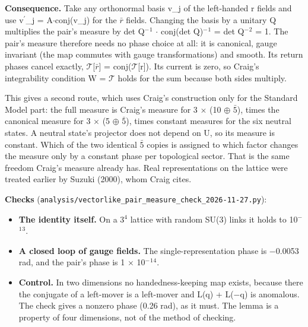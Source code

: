 \documentclass[
  11pt,
]{article}
\providecommand{\tightlist}{%
  \setlength{\itemsep}{0pt}\setlength{\parskip}{0pt}}
\begin{document}
\textbf{Consequence.} Take any orthonormal basis v\_j of the left-handed r fields and use v\ensuremath{^{\prime}}\_j = A\ensuremath{\cdot}conj(v\_j) for the \ensuremath{\bar{r}} fields. Changing the basis by a unitary Q multiplies the pair's measure by det Q\ensuremath{^{-}}\ensuremath{^{1}} \ensuremath{\cdot} conj(det Q)\ensuremath{^{-}}\ensuremath{^{1}} = \textbar det Q\textbar\ensuremath{^{-}}\ensuremath{^{2}} = 1. The pair's measure therefore needs no phase choice at all: it is canonical, gauge invariant (the map commutes with gauge transformations) and smooth. Its return phases cancel exactly, \ensuremath{\mathcal{T}}{[}\ensuremath{\bar{r}}{]} = conj(\ensuremath{\mathcal{T}}{[}r{]}). Its current is zero, so Craig's integrability condition W = \ensuremath{\mathcal{T}} holds for the sum because both sides multiply.

This gives a second route, which uses Craig's construction only for the Standard Model part: the full measure is Craig's measure for 3 \ensuremath{\times} (10 \ensuremath{\oplus} \ensuremath{\bar{5}}), times the canonical measure for 3 \ensuremath{\times} (5 \ensuremath{\oplus} \ensuremath{\bar{5}}), times constant measures for the six neutral states. A neutral state's projector does not depend on U, so its measure is constant. Which of the two identical \ensuremath{\bar{5}} copies is assigned to which factor changes the measure only by a constant phase per topological sector. That is the same freedom Craig's measure already has. Real representations on the lattice were treated earlier by Suzuki (2000), whom Craig cites.

\textbf{Checks} (\texttt{analysis/vectorlike\_pair\_measure\_check\_2026-11-27.py}):

\begin{itemize}
\tightlist
\item
  \textbf{The identity itself.} On a 3\ensuremath{^{4}} lattice with random SU(3) links it holds to 10\ensuremath{^{-}}\ensuremath{^{1}}\ensuremath{^{3}}.
\item
  \textbf{A closed loop of gauge fields.} The single-representation phase is \ensuremath{-}0.0053 rad, and the pair's phase is 1 \ensuremath{\times} 10\ensuremath{^{-}}\ensuremath{^{1}}\ensuremath{^{4}}.
\item
  \textbf{Control.} In two dimensions no handedness-keeping map exists, because there the conjugate of a left-mover is a left-mover and L(q) + L(\ensuremath{-}q) is anomalous. The check gives a nonzero phase (0.26 rad), as it must. The lemma is a property of four dimensions, not of the method of checking.
\end{itemize}
\end{document}
